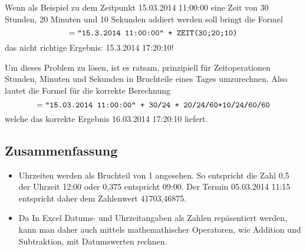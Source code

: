 Wenn als Beispiel zu dem Zeitpunkt 15.03.2014 11:00:00 eine Zeit von 30 Stunden, 20 Minuten und 10 Sekunden addiert werden soll bringt die Formel
$$ =\text{\texttt{"15.3.2014 11:00:00" + ZEIT(30;20;10)}}$$
das nicht richtige  Ergebnis: 15.3.2014 17:20:10!
\begin{lightbulbbox}
Um dieses Problem zu lösen, ist es ratsam, prinzipiell für Zeitoperationen Stunden, Minuten und Sekunden in Bruchteile eines Tages umzurechnen. Also lautet die Formel für die korrekte Berechnung
$$ =\text{\texttt{"15.03.2014 11:00:00" + 30/24 + 20/24/60+10/24/60/60}}$$
welche das korrekte Ergebnis 16.03.2014 17:20:10 liefert.
\end{lightbulbbox}



\subsection{Zusammenfassung}

	
\begin{itemize}
	\item  Uhrzeiten werden als Bruchteil von 1 angesehen. So entspricht die Zahl 0,5 der Uhrzeit 12:00 oder 0,375 entspricht 09:00. Der Termin 05.03.2014 11:15 entspricht daher dem Zahlenwert 41703,46875.

	\item Da In Excel Datums- und Uhrzeitangaben als Zahlen repäsentiert werden, kann man daher auch mittels mathemathischer Operatoren, wie Addition und Subtraktion, mit Datumswerten rechnen.	
	
\end{itemize}